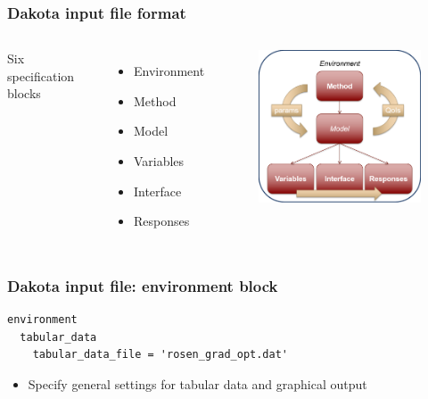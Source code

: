 \documentclass[t]{beamer}
\begin{document}
\begin{frame}
  \frametitle{Dakota input file format}
  \begin{columns}
    \newline\newline\newline
    Six specification blocks
    \begin{itemize}
      \item Environment
      \item Method
      \item Model
      \item Variables
      \item Interface
      \item Responses
    \end{itemize}
    \begin{figure}
      \includegraphics[width=70mm]{images/input_6_blocks.png}
    \end{figure}
  \end{columns}
\end{frame}


\begin{frame}[fragile]
  \frametitle{Dakota input file: environment block}
  \begin{small}\begin{lstlisting}
environment
  tabular_data
    tabular_data_file = 'rosen_grad_opt.dat'\end{lstlisting}\end{small}
  \begin{itemize}
    \item Specify general settings for tabular data and graphical output
  \end{itemize}
\end{frame}
\end{document}
